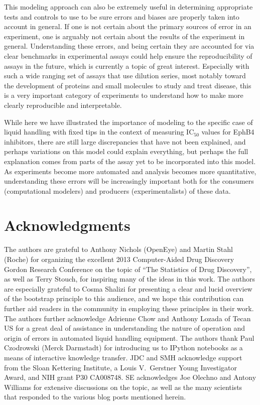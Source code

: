 \documentclass[aps,pre,twocolumn,nofootinbib,superscriptaddress,linenumbers]{revtex4-1}
\begin{document}
This modeling approach can also be extremely useful in determining appropriate tests and controls to use to be sure errors and biases are properly taken into account in general. 
If one is not certain about the primary sources of error in an experiment, one is arguably not certain about the results of the experiment in general. 
Understanding these errors, and being certain they are accounted for via clear benchmarks in experimental assays could help ensure the reproducibility of assays in the future, which is currently a topic of great interest. 
Especially with such a wide ranging set of assays that use dilution series, most notably toward the development of proteins and small molecules to study and treat disease, this is a very important category of experiments to understand how to make more clearly reproducible and interpretable.

While here we have illustrated the importance of modeling to the specific case of liquid handling with fixed tips in the context of measuring IC$_{50}$ values for EphB4 inhibitors, there are still large discrepancies that have not been explained, and perhaps variations on this model could explain everything, but perhaps the full explanation comes from parts of the assay yet to be incorporated into this model.
As experiments become more automated and analysis becomes more quantitative, understanding these errors will be increasingly important both for the consumers (computational modelers) and producers (experimentalists) of these data.


\section{Acknowledgments}
\label{section:acknowledgments}
The authors are grateful to Anthony Nichols (OpenEye) and Martin Stahl (Roche) for organizing the excellent 2013 Computer-Aided Drug Discovery Gordon Research Conference on the topic of ``The Statistics of Drug Discovery'', as well as Terry Stouch, for inspiring many of the ideas in this work.
The authors are especially grateful to Cosma Shalizi for presenting a clear and lucid overview of the bootstrap principle to this audience, and we hope this contribution can further aid readers in the community in employing these principles in their work.
The authors further acknowledge Adrienne Chow and Anthony Lozada of Tecan US for a great deal of assistance in understanding the nature of operation and origin of errors in automated liquid handling equipment.
The authors thank Paul Czodrowski (Merck Darmstadt) for introducing us to IPython notebooks as a means of interactive knowledge transfer.
JDC and SMH acknowledge support from the Sloan Kettering Institute, a Louis V.~Gerstner Young Investigator Award, and NIH grant P30 CA008748.
SE acknowledges Joe Olechno and Antony Williams for extensive discussions on the topic, as well as the many scientists that responded to the various blog posts mentioned herein.
\end{document}
